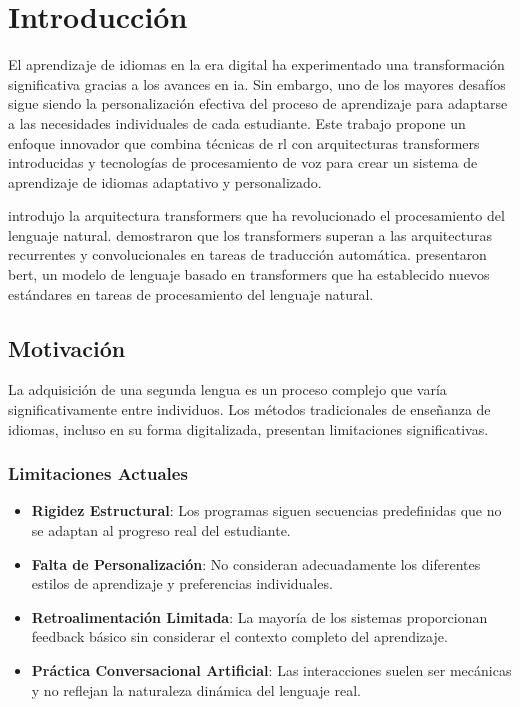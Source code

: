\chapter{Introducción}
\label{introduccion}

El aprendizaje de idiomas en la era digital ha experimentado una transformación significativa gracias a los avances en \gls{ia}. Sin embargo, uno de los mayores desafíos sigue siendo la personalización efectiva del proceso de aprendizaje para adaptarse a las necesidades individuales de cada estudiante. Este trabajo propone un enfoque innovador que combina técnicas de \gls{rl} con arquitecturas \gls{transformers} introducidas y tecnologías de procesamiento de voz para crear un sistema de aprendizaje de idiomas adaptativo y personalizado.

\citep{vaswani2017attention} introdujo la arquitectura \gls{transformers} que ha revolucionado el procesamiento del lenguaje natural. \citep{vaswani2017attention} demostraron que los \gls{transformers} superan a las arquitecturas recurrentes y convolucionales en tareas de traducción automática. \citep{devlin2018bert} presentaron \gls{bert}, un modelo de lenguaje basado en \gls{transformers} que ha establecido nuevos estándares en tareas de procesamiento del lenguaje natural.

\section{Motivación}
\label{motivacion}

La adquisición de una segunda lengua es un proceso complejo que varía significativamente entre individuos. Los métodos tradicionales de enseñanza de idiomas, incluso en su forma digitalizada, presentan limitaciones significativas.

\subsection{Limitaciones Actuales}
\label{limitaciones-actuales}

\begin{itemize}
  \item \textbf{Rigidez Estructural}: Los programas siguen secuencias predefinidas que no se adaptan al progreso real del estudiante.
  \item \textbf{Falta de Personalización}: No consideran adecuadamente los diferentes estilos de aprendizaje y preferencias individuales.
  \item \textbf{Retroalimentación Limitada}: La mayoría de los sistemas proporcionan feedback básico sin considerar el contexto completo del aprendizaje.
  \item \textbf{Práctica Conversacional Artificial}: Las interacciones suelen ser mecánicas y no reflejan la naturaleza dinámica del lenguaje real.
\end{itemize}

